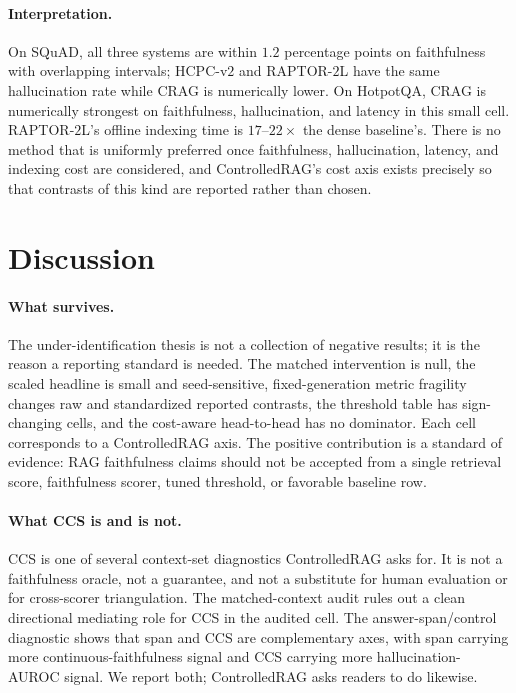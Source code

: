 \paragraph{Interpretation.} On SQuAD, all three systems are within
$1.2$ percentage points on faithfulness with overlapping intervals;
HCPC-v$2$ and RAPTOR-$2$L have the same hallucination rate while CRAG
is numerically lower. On HotpotQA, CRAG is numerically strongest on
faithfulness, hallucination, and latency in this small cell. RAPTOR-$2$L's offline
indexing time is $17$--$22\times$ the dense baseline's. There is no
method that is uniformly preferred once faithfulness, hallucination, latency, and
indexing cost are considered, and ControlledRAG's cost axis exists
precisely so that contrasts of this kind are reported rather than
chosen.

\section{Discussion}
\label{sec:discussion}

\paragraph{What survives.} The under-identification thesis is not a
collection of negative results; it is the reason a reporting standard is
needed. The matched intervention is null, the scaled headline is small
and seed-sensitive, fixed-generation metric fragility changes raw and
standardized reported contrasts, the threshold table has sign-changing
cells, and
the cost-aware head-to-head has no dominator. Each cell corresponds to a
ControlledRAG axis. The positive contribution is a standard of evidence:
RAG faithfulness claims should not be accepted from a single retrieval
score, faithfulness scorer, tuned threshold, or favorable baseline row.

\paragraph{What CCS is and is not.} CCS is one of several context-set
diagnostics ControlledRAG asks for. It is not a faithfulness oracle,
not a guarantee, and not a substitute for human evaluation or for
cross-scorer triangulation. The matched-context audit rules out a
clean directional mediating role for CCS in the audited cell. The
answer-span/control diagnostic shows that span and CCS are
complementary axes, with span carrying more continuous-faithfulness
signal and CCS carrying more hallucination-AUROC signal. We report
both; ControlledRAG asks readers to do likewise.

